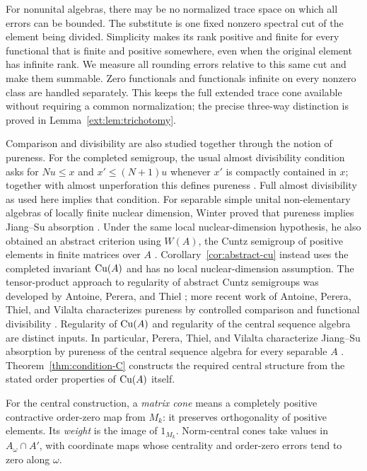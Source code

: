 For nonunital algebras, there may be no normalized trace space on
which all errors can be bounded. The substitute is one fixed nonzero
spectral cut of the element being divided. Simplicity makes its rank
positive and finite for every functional that is finite and positive
somewhere, even when the original element has infinite rank.
We measure all rounding errors relative to this same cut and make them
summable. Zero functionals and functionals infinite on every nonzero
class are handled separately. This keeps the full extended trace cone
available without requiring a common normalization; the precise
three-way distinction is proved in Lemma~\ref{ext:lem:trichotomy}.

Comparison and divisibility are also studied together through the
notion of pureness. For the completed semigroup, the usual almost
divisibility condition asks for $Nu\le x$ and $x'\le(N+1)u$ whenever
$x'$ is compactly contained in $x$; together with almost unperforation
this defines pureness \cite{APT2018}. Full almost divisibility as
used here implies that condition.
For separable simple unital non-elementary algebras of locally
finite nuclear dimension, Winter proved that pureness implies
Jiang--Su absorption \cite[Corollary~6.2]{Winter2012}. Under the same
local nuclear-dimension hypothesis, he also obtained an abstract
criterion using $W(A)$, the Cuntz semigroup of positive elements in
finite matrices over $A$ \cite[Corollary~6.4]{Winter2012}.
Corollary~\ref{cor:abstract-cu} instead uses the completed invariant
$\mathrm{Cu}(A)$ and has no local nuclear-dimension assumption.
The tensor-product approach to regularity of abstract Cuntz semigroups
was developed by Antoine, Perera, and
Thiel \cite{APT2018}; more recent work of Antoine, Perera, Thiel,
and Vilalta characterizes pureness by controlled comparison and
functional divisibility \cite[Theorem~C]{APTV2024}.
Regularity of $\mathrm{Cu}(A)$ and regularity of the central
sequence algebra are distinct inputs. In particular,
Perera, Thiel, and Vilalta characterize Jiang--Su absorption by
pureness of the central sequence algebra for every separable $A$
\cite[Theorem~3.6]{PTV2025}. Theorem~\ref{thm:condition-C}
constructs the required central structure from the stated order
properties of $\mathrm{Cu}(A)$ itself.

For the central construction, a \emph{matrix cone} means a completely
positive contractive order-zero map from $M_k$: it preserves
orthogonality of positive elements. Its \emph{weight} is the image of
$1_{M_k}$. Norm-central cones take values in $A_\omega\cap A'$,
with coordinate maps whose centrality and order-zero errors tend to
zero along $\omega$.

